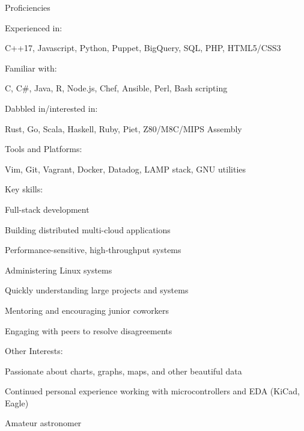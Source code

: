 \documentclass[letterpaper,12pt]{article}
\begin{document}
\begin{paracol}{2}
\vspace{2em}
\begin{rsection}{Proficiencies}
  \begin{rpara}{Experienced in:}%
    \raggedright
    C++17, Javascript, Python, Puppet, BigQuery, SQL, PHP, HTML5/CSS3
  \end{rpara}
  \begin{rpara}{Familiar with:}%
    \raggedright
    C, C\#, Java, R, Node.js, Chef, Ansible, Perl, Bash scripting
  \end{rpara}
  \begin{rpara}{Dabbled in/interested in:}%
    \raggedright
    Rust, Go, Scala, Haskell, Ruby, Piet, Z80/M8C/MIPS Assembly
  \end{rpara}
  \begin{rpara}{Tools and Platforms:}%
    \raggedright
    Vim, Git, Vagrant, Docker, Datadog, LAMP stack, GNU utilities
  \end{rpara}
  \newpage
  \begin{rsubitems}[
    leftmargin=1.5em,
    itemindent=0em,
    labelwidth=1.5em
  ]{Key skills:}
    \item Full-stack development
    \item Building distributed multi-cloud applications
    \item Performance-sensitive, high-throughput systems
    \item Administering Linux systems
    \item Quickly understanding large projects and systems
    \item Mentoring and encouraging junior coworkers
    \item Engaging with peers to resolve disagreements
  \end{rsubitems}
  \begin{rsubitems}[
    leftmargin=1.5em,
    itemindent=0em,
    labelwidth=1.5em
  ]{Other Interests:}
    \item Passionate about charts, graphs, maps, and other beautiful data\\
    \item Continued personal experience working with microcontrollers and EDA (KiCad, Eagle)
    \item Amateur astronomer
  \end{rsubitems}
\end{rsection}


\end{paracol}
\end{document}
